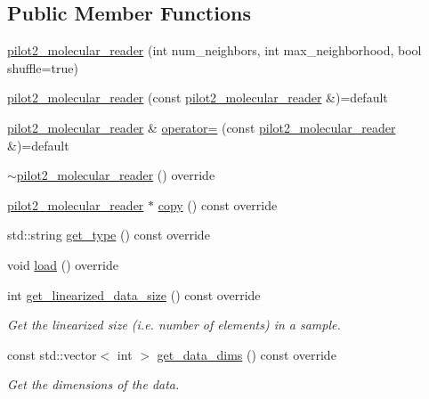 \subsection*{Public Member Functions}
\begin{DoxyCompactItemize}
\item 
\hyperlink{classlbann_1_1pilot2__molecular__reader_ac883c7e0fcc935bc6573efa3352275ca}{pilot2\+\_\+molecular\+\_\+reader} (int num\+\_\+neighbors, int max\+\_\+neighborhood, bool shuffle=true)
\item 
\hyperlink{classlbann_1_1pilot2__molecular__reader_a6d74b894fabaf78175684fcc2f747b34}{pilot2\+\_\+molecular\+\_\+reader} (const \hyperlink{classlbann_1_1pilot2__molecular__reader}{pilot2\+\_\+molecular\+\_\+reader} \&)=default
\item 
\hyperlink{classlbann_1_1pilot2__molecular__reader}{pilot2\+\_\+molecular\+\_\+reader} \& \hyperlink{classlbann_1_1pilot2__molecular__reader_a12df3df74aa901cb7304903ad99f5df6}{operator=} (const \hyperlink{classlbann_1_1pilot2__molecular__reader}{pilot2\+\_\+molecular\+\_\+reader} \&)=default
\item 
\hyperlink{classlbann_1_1pilot2__molecular__reader_a8e55c88f83639d421b5f2f1556f8a590}{$\sim$pilot2\+\_\+molecular\+\_\+reader} () override
\item 
\hyperlink{classlbann_1_1pilot2__molecular__reader}{pilot2\+\_\+molecular\+\_\+reader} $\ast$ \hyperlink{classlbann_1_1pilot2__molecular__reader_a6582f4c77b62df27aa603dc58a4f4512}{copy} () const override
\item 
std\+::string \hyperlink{classlbann_1_1pilot2__molecular__reader_a8548d10554c6e1ef921cf5d113530e72}{get\+\_\+type} () const override
\item 
void \hyperlink{classlbann_1_1pilot2__molecular__reader_a1b5160021a532f5f19897bd2250e3a46}{load} () override
\item 
int \hyperlink{classlbann_1_1pilot2__molecular__reader_ad8d83938c6878019dd0c5945483e0504}{get\+\_\+linearized\+\_\+data\+\_\+size} () const override
\begin{DoxyCompactList}\small\item\em Get the linearized size (i.\+e. number of elements) in a sample. \end{DoxyCompactList}\item 
const std\+::vector$<$ int $>$ \hyperlink{classlbann_1_1pilot2__molecular__reader_a0a59a7a38c01c4d8716fb24d36663c99}{get\+\_\+data\+\_\+dims} () const override
\begin{DoxyCompactList}\small\item\em Get the dimensions of the data. \end{DoxyCompactList}\item 

\end{DoxyCompactItemize}

